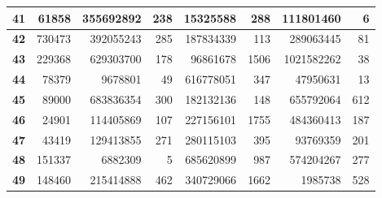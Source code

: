 \documentclass[12pt]{article}
\begin{document}
\begin{table}[!htbp]
{\begin{tabular}{crrrrrrr}
\multicolumn{1}{|c|}{\textbf{41}} & \multicolumn{1}{r|}{61858} & \multicolumn{1}{r|}{355692892} & \multicolumn{1}{r|}{238} & \multicolumn{1}{r|}{15325588} & \multicolumn{1}{r|}{288} & \multicolumn{1}{r|}{111801460} & \multicolumn{1}{r|}{6} \\ \hline
\multicolumn{1}{|c|}{\textbf{42}} & \multicolumn{1}{r|}{730473} & \multicolumn{1}{r|}{392055243} & \multicolumn{1}{r|}{285} & \multicolumn{1}{r|}{187834339} & \multicolumn{1}{r|}{113} & \multicolumn{1}{r|}{289063445} & \multicolumn{1}{r|}{81} \\ \hline
\multicolumn{1}{|c|}{\textbf{43}} & \multicolumn{1}{r|}{229368} & \multicolumn{1}{r|}{629303700} & \multicolumn{1}{r|}{178} & \multicolumn{1}{r|}{96861678} & \multicolumn{1}{r|}{1506} & \multicolumn{1}{r|}{1021582262} & \multicolumn{1}{r|}{38} \\ \hline
\multicolumn{1}{|c|}{\textbf{44}} & \multicolumn{1}{r|}{78379} & \multicolumn{1}{r|}{9678801} & \multicolumn{1}{r|}{49} & \multicolumn{1}{r|}{616778051} & \multicolumn{1}{r|}{347} & \multicolumn{1}{r|}{47950631} & \multicolumn{1}{r|}{13} \\ \hline
\multicolumn{1}{|c|}{\textbf{45}} & \multicolumn{1}{r|}{89000} & \multicolumn{1}{r|}{683836354} & \multicolumn{1}{r|}{300} & \multicolumn{1}{r|}{182132136} & \multicolumn{1}{r|}{148} & \multicolumn{1}{r|}{655792064} & \multicolumn{1}{r|}{612} \\ \hline
\multicolumn{1}{|c|}{\textbf{46}} & \multicolumn{1}{r|}{24901} & \multicolumn{1}{r|}{114405869} & \multicolumn{1}{r|}{107} & \multicolumn{1}{r|}{227156101} & \multicolumn{1}{r|}{1755} & \multicolumn{1}{r|}{484360413} & \multicolumn{1}{r|}{187} \\ \hline
\multicolumn{1}{|c|}{\textbf{47}} & \multicolumn{1}{r|}{43419} & \multicolumn{1}{r|}{129413855} & \multicolumn{1}{r|}{271} & \multicolumn{1}{r|}{280115103} & \multicolumn{1}{r|}{395} & \multicolumn{1}{r|}{93769359} & \multicolumn{1}{r|}{201} \\ \hline
\multicolumn{1}{|c|}{\textbf{48}} & \multicolumn{1}{r|}{151337} & \multicolumn{1}{r|}{6882309} & \multicolumn{1}{r|}{5} & \multicolumn{1}{r|}{685620899} & \multicolumn{1}{r|}{987} & \multicolumn{1}{r|}{574204267} & \multicolumn{1}{r|}{277} \\ \hline
\multicolumn{1}{|c|}{\textbf{49}} & \multicolumn{1}{r|}{148460} & \multicolumn{1}{r|}{215414888} & \multicolumn{1}{r|}{462} & \multicolumn{1}{r|}{340729066} & \multicolumn{1}{r|}{1662} & \multicolumn{1}{r|}{1985738} & \multicolumn{1}{r|}{528} \\ \hline

\end{tabular}}
\end{table}
\end{document}
